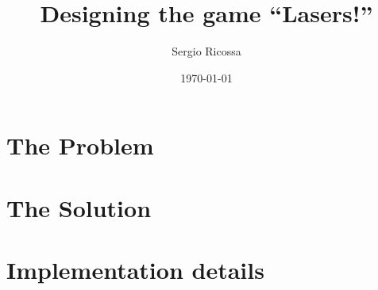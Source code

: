 \documentclass[12pt]{article}
\date{\Large{ \today}}
\author{\Large{Sergio Ricossa}}
\title{\huge{\textsf{Designing the game “Lasers!”}}}
\begin{document}
\maketitle
\tableofcontents

\section{The Problem}



\section{The Solution}



\section{Implementation details}
\end{document}
